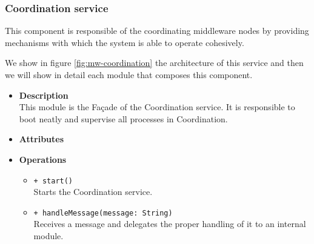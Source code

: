 \subsubsection{Coordination service}

This component is responsible of the coordinating middleware nodes by
providing mechanisms with which the system is able to operate cohesively.

We show in figure \ref{fig:mw-coordination} the architecture of this service
and then we will show in detail each module that composes this component.


\FloatBarrier
\begin{itemize}
  \item \textbf{Description} \\
    This module is the Fa\c cade of the Coordination service. It is responsible
    to boot neatly and supervise all processes in Coordination.
  \item \textbf{Attributes}
  \item \textbf{Operations}
  \begin{itemize}
    \item \texttt{+ start()} \\
    Starts the Coordination service.
    \item \texttt{+ handleMessage(message: String)} \\
    Receives a message and delegates the proper handling of it to an internal
    module.
  \end{itemize}
\end{itemize}

